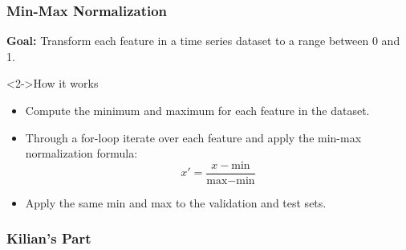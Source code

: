 \documentclass[t,english]{beamer}
\begin{document}
\begin{frame}
  \frametitle{Min-Max Normalization}
    \textbf{Goal:} Transform each feature in a time series dataset to a range between 0 and 1.

    \begin{block}<2->{How it works}
      \begin{itemize}
        \item<2-> Compute the minimum and maximum for each feature in the dataset.
        \item<3-> Through a for-loop iterate over each feature and apply the min-max normalization formula:
        \begin{equation}
              x' = \frac{x - \text{min}}{\text{max} - \text{min}}
        \end{equation}
        \item<4-> Apply the same min and max to the validation and test sets.
      \end{itemize}
    \end{block}
\end{frame}



\begin{frame}
  \frametitle{Kilian's Part}
    
\end{frame}
\end{document}
